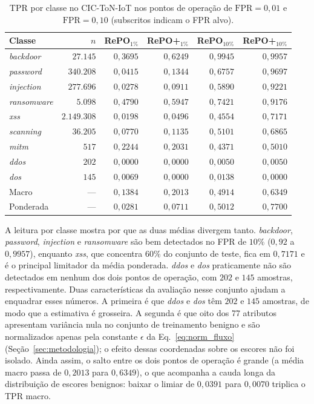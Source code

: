 \documentclass[conference]{IEEEtran}
\begin{document}
\begin{table}[!t]
\centering
\footnotesize
\setlength{\tabcolsep}{3.5pt}
\setlength{\tabcolsep}{2.5pt}
\caption{TPR por classe no CIC-ToN-IoT nos pontos de operação de $\text{FPR} = 0{,}01$ e $\text{FPR} = 0{,}10$ (subscritos indicam o FPR alvo).}
\label{tab:toniot_normal}
\begin{tabular}{@{}lrrrrr@{}}
\toprule
\textbf{Classe} & \textbf{$n$} & \textbf{RePO$_{1\%}$} & \textbf{RePO+$_{1\%}$} & \textbf{RePO$_{10\%}$} & \textbf{RePO+$_{10\%}$} \\
\midrule
\textit{backdoor} & $27.145$ & $0{,}3695$ & $0{,}6249$ & $0{,}9945$ & $0{,}9957$ \\
\textit{password} & $340.208$ & $0{,}0415$ & $0{,}1344$ & $0{,}6757$ & $0{,}9697$ \\
\textit{injection} & $277.696$ & $0{,}0278$ & $0{,}0911$ & $0{,}5890$ & $0{,}9221$ \\
\textit{ransomware} & $5.098$ & $0{,}4790$ & $0{,}5947$ & $0{,}7421$ & $0{,}9176$ \\
\textit{xss} & $2.149.308$ & $0{,}0198$ & $0{,}0496$ & $0{,}4554$ & $0{,}7171$ \\
\textit{scanning} & $36.205$ & $0{,}0770$ & $0{,}1135$ & $0{,}5101$ & $0{,}6865$ \\
\textit{mitm} & $517$ & $0{,}2244$ & $0{,}2031$ & $0{,}4371$ & $0{,}5010$ \\
\textit{ddos} & $202$ & $0{,}0000$ & $0{,}0000$ & $0{,}0050$ & $0{,}0050$ \\
\textit{dos} & $145$ & $0{,}0069$ & $0{,}0000$ & $0{,}0138$ & $0{,}0000$ \\
\midrule
Macro & --- & $0{,}1384$ & $0{,}2013$ & $0{,}4914$ & $0{,}6349$ \\
Ponderada & --- & $0{,}0281$ & $0{,}0711$ & $0{,}5012$ & $0{,}7700$ \\
\bottomrule
\end{tabular}
\end{table}

A leitura por classe mostra por que as duas médias divergem tanto.
\textit{backdoor}, \textit{password}, \textit{injection} e \textit{ransomware} são bem detectados no FPR de $10\%$ ($0{,}92$ a $0{,}9957$), enquanto \textit{xss}, que concentra $60\%$ do conjunto de teste, fica em $0{,}7171$ e é o principal limitador da média ponderada.
\textit{ddos} e \textit{dos} praticamente não são detectados em nenhum dos dois pontos de operação, com $202$ e $145$ amostras, respectivamente.
Duas características da avaliação nesse conjunto ajudam a enquadrar esses números.
A primeira é que \textit{ddos} e \textit{dos} têm $202$ e $145$ amostras, de modo que a estimativa é grosseira.
A segunda é que oito dos $77$ atributos apresentam variância nula no conjunto de treinamento benigno e são normalizados apenas pela constante $\epsilon$ da Eq.~\eqref{eq:norm_fluxo} (Seção~\ref{sec:metodologia}); o efeito dessas coordenadas sobre os escores não foi isolado.
Ainda assim, o salto entre os dois pontos de operação é grande (a média macro passa de $0{,}2013$ para $0{,}6349$), o que acompanha a cauda longa da distribuição de escores benignos: baixar o limiar de $0{,}0391$ para $0{,}0070$ triplica o TPR macro.
\end{document}
